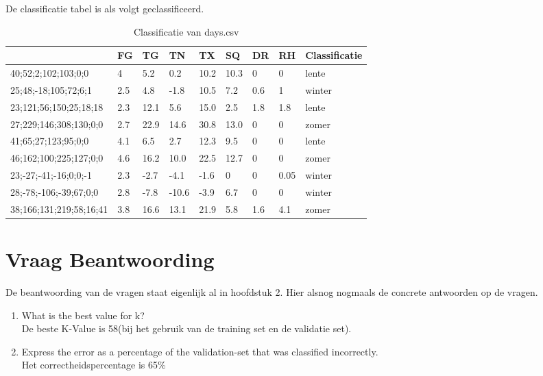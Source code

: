 \documentclass[a4paper]{report}
\begin{document}
De classificatie tabel is als volgt geclassificeerd.
\begin{table}[h]
  \centering
  \begin{tabular}{|l|l|l|l|l|l|l|l|l|}
  \hline
  & \textbf{FG} & \textbf{TG} & \textbf{TN} & \textbf{TX} & \textbf{SQ} & \textbf{DR} & \textbf{RH} & \textbf{Classificatie} \\
  \hline
  40;52;2;102;103;0;0 & 4 & 5.2 & 0.2 & 10.2 & 10.3 & 0 & 0 & lente\\
  \hline
  25;48;-18;105;72;6;1 & 2.5 & 4.8 & -1.8 & 10.5 & 7.2 & 0.6 & 1 & winter \\
  \hline
  23;121;56;150;25;18;18 & 2.3 & 12.1 & 5.6 & 15.0 & 2.5 & 1.8 & 1.8 & lente\\
  \hline
  27;229;146;308;130;0;0 & 2.7 & 22.9 & 14.6 & 30.8 & 13.0 & 0 & 0 & zomer\\
  \hline
  41;65;27;123;95;0;0 & 4.1 & 6.5 & 2.7 & 12.3 & 9.5 & 0 & 0 & lente\\
  \hline
  46;162;100;225;127;0;0 & 4.6 & 16.2 & 10.0 & 22.5 & 12.7 & 0 & 0 & zomer \\
  \hline
  23;-27;-41;-16;0;0;-1 & 2.3 & -2.7 & -4.1 & -1.6 & 0 & 0 & 0.05 & winter\\
  \hline
  28;-78;-106;-39;67;0;0 & 2.8 & -7.8 & -10.6 & -3.9 & 6.7 & 0 & 0 & winter \\
  \hline
  38;166;131;219;58;16;41 & 3.8 & 16.6 & 13.1 & 21.9 & 5.8 & 1.6 & 4.1 & zomer\\
  \hline
  \end{tabular}
  \caption{Classificatie van days.csv}
  \label{tab:class_days}
  \end{table}
  

\chapter{Vraag Beantwoording}
De beantwoording van de vragen staat eigenlijk al in hoofdstuk 2. Hier alsnog nogmaals de concrete antwoorden op de vragen.
\begin{enumerate}
  \item What is the best value for k? \\
  De beste K-Value is 58(bij het gebruik van de training set en de validatie set).
  \item Express the error as a percentage of the validation-set that was classified incorrectly.\\
   Het correctheidspercentage is 65\%
\end{enumerate}
\end{document}
